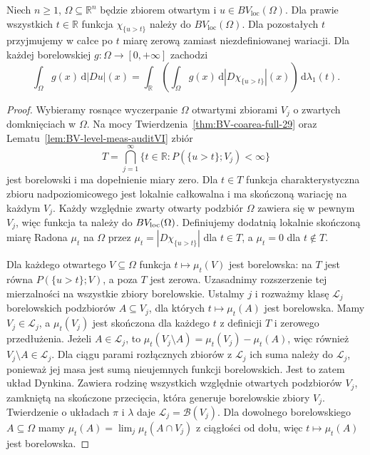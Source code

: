 \begin{wniosek}
\label{cor:BV-coarea-weighted-29}
Niech $n\ge1$, $\Omega\subseteq\mathbb R^n$
będzie zbiorem otwartym i $u\in BV_{\mathrm{loc}}(\Omega)$.
Dla prawie wszystkich $t\in\mathbb R$ funkcja
$\chi_{\{u>t\}}$ należy do $BV_{\mathrm{loc}}(\Omega)$.
Dla pozostałych $t$ przyjmujemy w całce po $t$
miarę zerową zamiast niezdefiniowanej wariacji.
Dla każdej borelowskiej $g:\Omega\to[0,+\infty]$
zachodzi
\[
 \int_\Omega g(x)\,\mathrm d|Du|(x)
 =\int_{\mathbb R}\left(\int_\Omega g(x)
 \,\mathrm d|D\chi_{\{u>t\}}|(x)\right)
 \,\mathrm d\lambda_1(t).
\]
\end{wniosek}
\begin{proof}
Wybieramy rosnące wyczerpanie $\Omega$
otwartymi zbiorami $V_j$ o zwartych domknięciach
w $\Omega$. Na mocy Twierdzenia~\ref{thm:BV-coarea-full-29}
oraz Lematu~\ref{lem:BV-level-meas-auditVI}
zbiór
\[
 T=\bigcap_{j=1}^\infty
 \{t\in\mathbb R:P(\{u>t\};V_j)<\infty\}
\]
jest borelowski i ma dopełnienie miary zero.
Dla $t\in T$ funkcja charakterystyczna
zbioru nadpoziomicowego jest lokalnie całkowalna
i ma skończoną wariację na każdym $V_j$.
Każdy względnie zwarty otwarty podzbiór $\Omega$
zawiera się w pewnym $V_j$, więc funkcja ta
należy do $BV_{\rm loc}(\Omega)$.
Definiujemy dodatnią lokalnie skończoną
miarę Radona $\mu_t$ na $\Omega$ przez
$\mu_t=|D\chi_{\{u>t\}}|$ dla $t\in T$,
a $\mu_t=0$ dla $t\notin T$.

Dla każdego otwartego $V\subseteq\Omega$
funkcja $t\mapsto\mu_t(V)$ jest borelowska:
na $T$ jest równa $P(\{u>t\};V)$,
a poza $T$ jest zerowa.
Uzasadnimy rozszerzenie tej mierzalności
na wszystkie zbiory borelowskie.
Ustalmy $j$ i rozważmy klasę $\mathcal L_j$
borelowskich podzbiorów $A\subseteq V_j$,
dla których $t\mapsto\mu_t(A)$ jest borelowska.
Mamy $V_j\in\mathcal L_j$, a $\mu_t(V_j)$
jest skończona dla każdego $t$ z definicji $T$
i zerowego przedłużenia.
Jeżeli $A\in\mathcal L_j$, to
$\mu_t(V_j\setminus A)=\mu_t(V_j)-\mu_t(A)$,
więc również $V_j\setminus A\in\mathcal L_j$.
Dla ciągu parami rozłącznych zbiorów z
$\mathcal L_j$ ich suma należy do $\mathcal L_j$,
ponieważ jej masa jest sumą nieujemnych
funkcji borelowskich.
Jest to zatem układ Dynkina.
Zawiera rodzinę wszystkich względnie otwartych
podzbiorów $V_j$, zamkniętą na skończone
przecięcia, która generuje borelowskie zbiory
$V_j$. Twierdzenie o układach $\pi$ i $\lambda$
daje $\mathcal L_j=\mathcal B(V_j)$.
Dla dowolnego borelowskiego $A\subseteq\Omega$
mamy $\mu_t(A)=\lim_j\mu_t(A\cap V_j)$
z ciągłości od dołu, więc $t\mapsto\mu_t(A)$
jest borelowska.


\end{proof}
